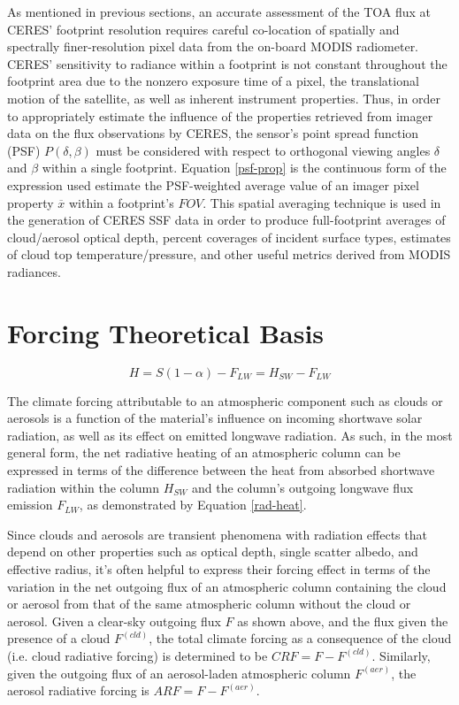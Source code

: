 \documentclass[12pt]{article}
\begin{document}
    As mentioned in previous sections, an accurate assessment of the TOA flux at CERES' footprint resolution requires careful co-location of spatially and spectrally finer-resolution pixel data from the on-board MODIS radiometer. CERES' sensitivity to radiance within a footprint is not constant throughout the footprint area due to the nonzero exposure time of a pixel, the translational motion of the satellite, as well as inherent instrument properties. Thus, in order to appropriately estimate the influence of the properties retrieved from imager data on the flux observations by CERES, the sensor's point spread function (PSF) $P(\delta,\beta)$ must be considered with respect to orthogonal viewing angles $\delta$ and $\beta$ within a single footprint. Equation \ref{psf-prop} is the continuous form of the expression used estimate the PSF-weighted average value of an imager pixel property $\overline{x}$ within a footprint's $FOV$. This spatial averaging technique is used in the generation of CERES SSF data in order to produce full-footprint averages of cloud/aerosol optical depth, percent coverages of incident surface types, estimates of cloud top temperature/pressure, and other useful metrics derived from MODIS radiances.

    \section{Forcing Theoretical Basis}

    \begin{equation}\label{rad-heat}
        H = S(1-\alpha) - F_{LW} = H_{SW} - F_{LW}
    \end{equation}

    The climate forcing attributable to an atmospheric component such as clouds or aerosols is a function of the material's influence on incoming shortwave solar radiation, as well as its effect on emitted longwave radiation. As such, in the most general form, the net radiative heating of an atmospheric column can be expressed in terms of the difference between the heat from absorbed shortwave radiation within the column $H_{SW}$ and the column's outgoing longwave flux emission $F_{LW}$, as demonstrated by Equation \ref{rad-heat}.

    Since clouds and aerosols are transient phenomena with radiation effects that depend on other properties such as optical depth, single scatter albedo, and effective radius, it's often helpful to express their forcing effect in terms of the variation in the net outgoing flux of an atmospheric column containing the cloud or aerosol from that of the same atmospheric column without the cloud or aerosol. Given a clear-sky outgoing flux $F$ as shown above, and the flux given the presence of a cloud $F^{(cld)}$, the total climate forcing as a consequence of the cloud (i.e. cloud radiative forcing) is determined to be $CRF = F - F^{(cld)}$. Similarly, given the outgoing flux of an aerosol-laden atmospheric column $F^{(aer)}$, the aerosol radiative forcing is $ARF = F - F^{(aer)}$.
\end{document}
